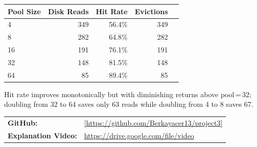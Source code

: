 \documentclass[11pt]{article}
\begin{document}
\vspace{2pt}
{\small
\begin{tabular}{@{}lrrrr@{}}
\toprule
Pool Size & Disk Reads & Hit Rate & Evictions \\
\midrule
 4 & 349 & 56.4\% & 349 \\
 8 & 282 & 64.8\% & 282 \\
16 & 191 & 76.1\% & 191 \\
32 & 148 & 81.5\% & 148 \\
64 &  85 & 89.4\% &  85 \\
\bottomrule
\end{tabular}}

Hit rate improves monotonically but with diminishing returns above pool\,=\,32;
doubling from 32 to 64 saves only 63 reads while doubling from 4 to 8 saves 67.

\vspace{4pt}
\begin{tabular}{@{}ll}
  \textbf{GitHub:} & \href{[https://github.com/Berkayacer13/project3]}{[https://github.com/Berkayacer13/project3]} \\[2pt]
  \textbf{Explanation Video:} & \href{[https://drive.google.com/file/d/1DJiPlc873piRfJiP-AoEraoxkArKnRQH/view?usp=sharing]}{https://drive.google.com/file/video} \\[2pt]
\end{tabular}
\end{document}
